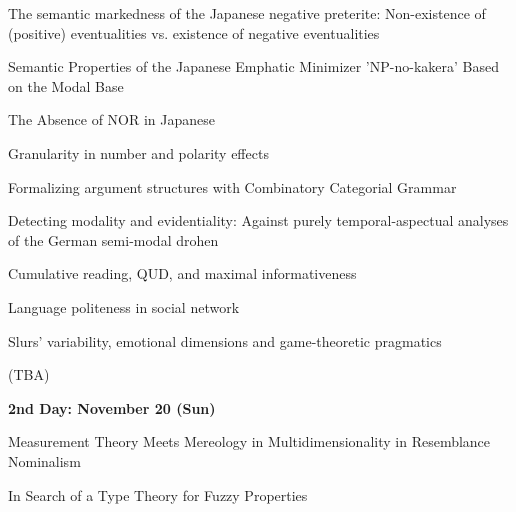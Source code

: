 \documentclass[12pt]{jarticle}
\begin{document}



 
  
      {The semantic markedness of the Japanese negative preterite: Non-existence of (positive) eventualities vs. existence of negative eventualities}
      {}
  
      {Semantic Properties of the Japanese Emphatic Minimizer 'NP-no-kakera' Based on the Modal Base}
      {}
  
      {The Absence of NOR in Japanese}
      {}



 
  
      {Granularity in number and polarity effects}
      {}
  
      {Formalizing argument structures with Combinatory Categorial Grammar}
      {}
  
      {Detecting modality and evidentiality: Against purely temporal-aspectual analyses of the German semi-modal drohen}
      {}



 
  
      {Cumulative reading, QUD, and maximal informativeness}
      {}
  
      {Language politeness in social network}
      {}
  
      {Slurs' variability, emotional dimensions and game-theoretic pragmatics}
      {}




  
      {(TBA)}
      {}




\noindent\textbf{\large 
2nd Day: November 20 (Sun)
}\\




  
      {Measurement Theory Meets Mereology in Multidimensionality in Resemblance Nominalism}
      {}
  
      {In Search of a Type Theory for Fuzzy Properties}
      {}
  
\end{document}
